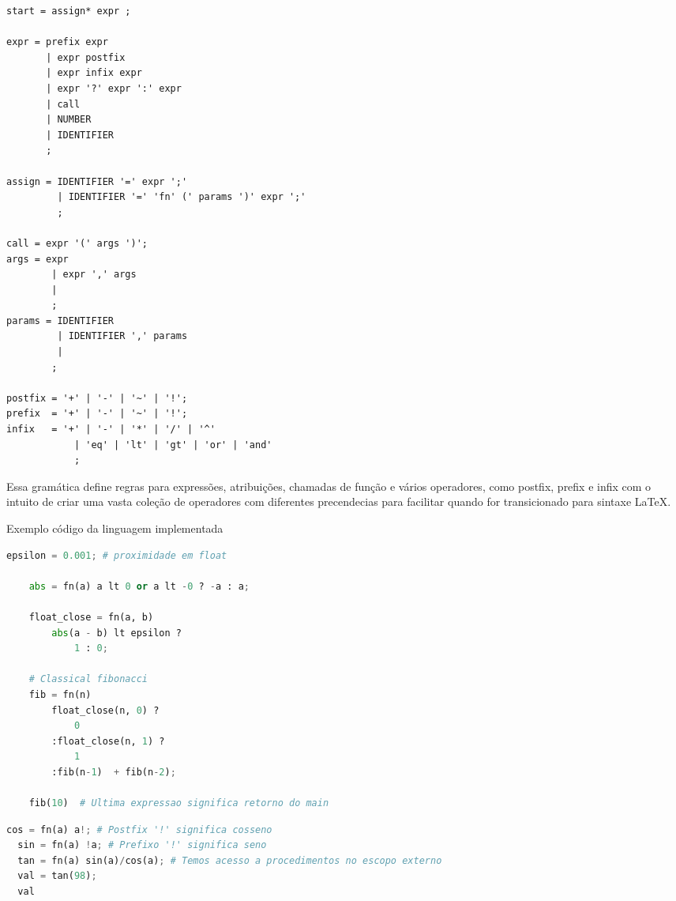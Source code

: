 \documentclass[english, 
               brazil, 
               bsc] %
               {dcomp-abntex2}
\begin{document}
\begin{verbatim}
start = assign* expr ;

expr = prefix expr 
       | expr postfix  
       | expr infix expr 
       | expr '?' expr ':' expr
       | call
       | NUMBER
       | IDENTIFIER
       ;

assign = IDENTIFIER '=' expr ';'
         | IDENTIFIER '=' 'fn' (' params ')' expr ';'
         ; 

call = expr '(' args ')';
args = expr
        | expr ',' args
        | 
        ;
params = IDENTIFIER
         | IDENTIFIER ',' params
         | 
        ;

postfix = '+' | '-' | '~' | '!';
prefix  = '+' | '-' | '~' | '!';
infix   = '+' | '-' | '*' | '/' | '^'
            | 'eq' | 'lt' | 'gt' | 'or' | 'and'
            ;

\end{verbatim}

Essa gramática define regras para expressões, atribuições, chamadas de função e vários operadores, como postfix, prefix e infix com o intuito de criar uma vasta coleção de operadores com diferentes precendecias para facilitar quando for transicionado para sintaxe \LaTeX .


\begin{algoritmo}[H]
	\caption{Exemplo código da linguagem implementada}
	\label{alg1}
	\label{alg1}
  \begin{lstlisting}[language = python]
    epsilon = 0.001; # proximidade em float

    abs = fn(a) a lt 0 or a lt -0 ? -a : a;

    float_close = fn(a, b) 
        abs(a - b) lt epsilon ? 
            1 : 0;

    # Classical fibonacci
    fib = fn(n)  
        float_close(n, 0) ? 
            0
        :float_close(n, 1) ?
            1
        :fib(n-1)  + fib(n-2);

    fib(10)  # Ultima expressao significa retorno do main
  \end{lstlisting}
\end{algoritmo}

\begin{algorithm}[H]
\begin{lstlisting}[language = python]
  cos = fn(a) a!; # Postfix '!' significa cosseno
  sin = fn(a) !a; # Prefixo '!' significa seno
  tan = fn(a) sin(a)/cos(a); # Temos acesso a procedimentos no escopo externo
  val = tan(98);
  val
\end{lstlisting}
\end{algorithm}
\end{document}
